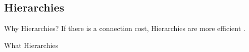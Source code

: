 
\subsection{Hierarchies}


\begin{frame}[c]{Why Hierarchies?}
    \Large
    \pause
    If there is a connection cost, Hierarchies are more efficient \cite{mengistu2016evolutionary}.
\end{frame}

\begin{frame}[c]{What Hierarchies}
    
\end{frame}



